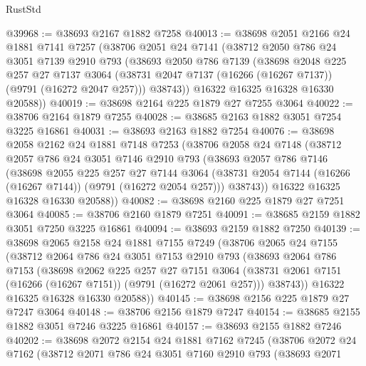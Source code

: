 \begin{lexlean}{RustStd}
\begin{coremodule}
@39968 := @38693 @2167 @1882 @7258
@40013 := @38698
    @2051
    @2166
    @24
    @1881
    @7141
    @7257
    (@38706
      @2051
      @24
      @7141
      (@38712
        @2050
        @786
        @24
        @3051
        @7139
        @2910
        @793
        (@38693
          @2050
          @786
          @7139
          (@38698
            @2048
            @225
            @257
            @27
            @7137
            @3064
            (@38731 @2047 @7137 (@16266 (@16267 @7137)) (@9791 (@16272 @2047 @257)))
            @38743))
        @16322
        @16325
        @16328
        @16330
        @20588))
@40019 := @38698 @2164 @225 @1879 @27 @7255 @3064
@40022 := @38706 @2164 @1879 @7255
@40028 := @38685 @2163 @1882 @3051 @7254 @3225 @16861
@40031 := @38693 @2163 @1882 @7254
@40076 := @38698
    @2058
    @2162
    @24
    @1881
    @7148
    @7253
    (@38706
      @2058
      @24
      @7148
      (@38712
        @2057
        @786
        @24
        @3051
        @7146
        @2910
        @793
        (@38693
          @2057
          @786
          @7146
          (@38698
            @2055
            @225
            @257
            @27
            @7144
            @3064
            (@38731 @2054 @7144 (@16266 (@16267 @7144)) (@9791 (@16272 @2054 @257)))
            @38743))
        @16322
        @16325
        @16328
        @16330
        @20588))
@40082 := @38698 @2160 @225 @1879 @27 @7251 @3064
@40085 := @38706 @2160 @1879 @7251
@40091 := @38685 @2159 @1882 @3051 @7250 @3225 @16861
@40094 := @38693 @2159 @1882 @7250
@40139 := @38698
    @2065
    @2158
    @24
    @1881
    @7155
    @7249
    (@38706
      @2065
      @24
      @7155
      (@38712
        @2064
        @786
        @24
        @3051
        @7153
        @2910
        @793
        (@38693
          @2064
          @786
          @7153
          (@38698
            @2062
            @225
            @257
            @27
            @7151
            @3064
            (@38731 @2061 @7151 (@16266 (@16267 @7151)) (@9791 (@16272 @2061 @257)))
            @38743))
        @16322
        @16325
        @16328
        @16330
        @20588))
@40145 := @38698 @2156 @225 @1879 @27 @7247 @3064
@40148 := @38706 @2156 @1879 @7247
@40154 := @38685 @2155 @1882 @3051 @7246 @3225 @16861
@40157 := @38693 @2155 @1882 @7246
@40202 := @38698
    @2072
    @2154
    @24
    @1881
    @7162
    @7245
    (@38706
      @2072
      @24
      @7162
      (@38712
        @2071
        @786
        @24
        @3051
        @7160
        @2910
        @793
        (@38693
          @2071

\end{coremodule}
\end{lexlean}
